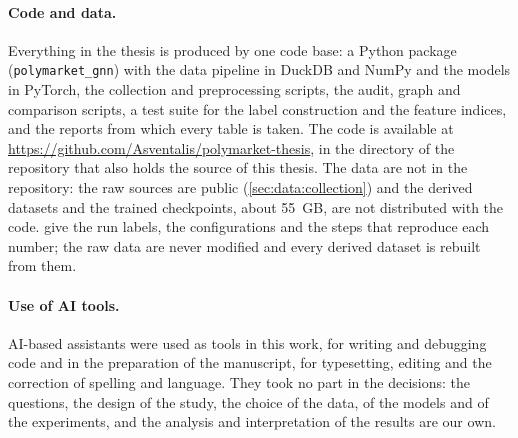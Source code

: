 \paragraph{Code and data.}  Everything in the thesis is produced by one code base: a
Python package (\texttt{polymarket\_gnn}) with the data pipeline in DuckDB and NumPy and
the models in PyTorch, the collection and preprocessing scripts, the audit, graph and
comparison scripts, a test suite for the label construction and the feature indices, and
the reports from which every table is taken.  The code is available at
\url{https://github.com/Asventalis/polymarket-thesis}, in the  directory of
the repository that also holds the source of this thesis.  The data are not in the
repository: the raw sources are public (\cref{sec:data:collection}) and the derived
datasets and the trained checkpoints, about 55~GB, are not distributed with the code.
 give the run labels, the configurations and the steps
that reproduce each number; the raw data are never modified and every derived dataset is
rebuilt from them.

\paragraph{Use of AI tools.}  AI-based assistants were used as tools in this work, for
writing and debugging code and in the preparation of the manuscript, for typesetting,
editing and the correction of spelling and language.  They took no part in the decisions: the
questions, the design of the study, the choice of the data, of the models and of the
experiments, and the analysis and interpretation of the results are our own.
